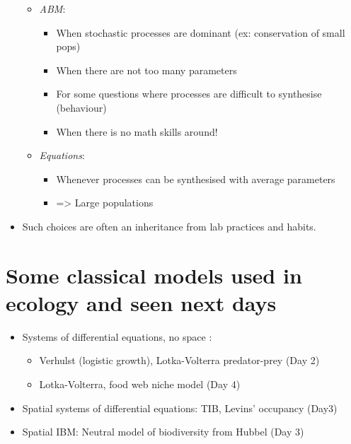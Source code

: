 \documentclass[
]{book}
\providecommand{\tightlist}{%
  \setlength{\itemsep}{0pt}\setlength{\parskip}{0pt}}
\theoremstyle{definition}
\theoremstyle{definition}
\theoremstyle{definition}
\theoremstyle{definition}
\theoremstyle{remark}
\begin{document}
\begin{itemize}
  \begin{itemize}
  \tightlist
  \item
    \emph{ABM}:

    \begin{itemize}
    \tightlist
    \item
      When stochastic processes are dominant (ex: conservation of small pops)
    \item
      When there are not too many parameters
    \item
      For some questions where processes are difficult to synthesise (behaviour)
    \item
      When there is no math skills around!
    \end{itemize}
  \item
    \emph{Equations}:

    \begin{itemize}
    \tightlist
    \item
      Whenever processes can be synthesised with average parameters
    \item
      =\textgreater{} Large populations
    \end{itemize}
  \end{itemize}
\item
  Such choices are often an inheritance from lab practices and habits.
\end{itemize}

\section{Some classical models used in ecology and seen next days}\label{some-classical-models-used-in-ecology-and-seen-next-days}

\begin{itemize}
\tightlist
\item
  Systems of differential equations, no space :

  \begin{itemize}
  \tightlist
  \item
    Verhulst (logistic growth), Lotka-Volterra predator-prey (Day 2)
  \item
    Lotka-Volterra, food web niche model (Day 4)
  \end{itemize}
\item
  Spatial systems of differential equations: TIB, Levins' occupancy (Day3)
\item
  Spatial IBM: Neutral model of biodiversity from Hubbel (Day 3)
\end{itemize}
\end{document}
